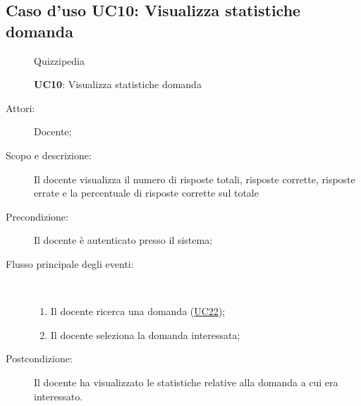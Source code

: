 \subsection{Caso d'uso UC10: Visualizza statistiche domanda}
	\begin{figure}[H]
		\centering
		\begin{resizedtikzpicture}{\textwidth}
		\begin{umlsystem}[x=0, fill=lightgray!20]{Quizzipedia}
		\end{umlsystem}
		\end{resizedtikzpicture}
		\caption{\textbf{UC10}: Visualizza statistiche domanda}
		\label{UC10}
	\end{figure}
\begin{description}
\item[Attori:] Docente;
\item[Scopo e descrizione:] Il docente visualizza il numero di risposte totali, risposte corrette, risposte errate e la percentuale di risposte corrette sul totale
      \item[Precondizione:] Il docente è autenticato presso il sistema;

        \item[Flusso principale degli eventi:] \ 
 \begin{enumerate}
          \item Il docente ricerca una domanda (\hyperlink{UC22}{UC22});
          \item Il docente seleziona la domanda interessata;

      \end{enumerate}
    \item[Postcondizione:] Il docente ha visualizzato le statistiche relative alla domanda a cui era interessato.
  \end{description}
\hypertarget{UC11}{}
